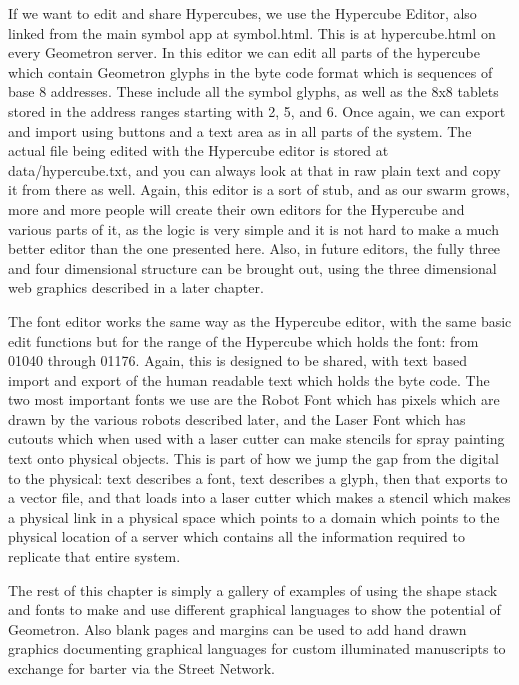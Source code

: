 If we want to edit and share Hypercubes, we use the Hypercube Editor, also linked from the main symbol app at symbol.html.  This is at hypercube.html on every Geometron server.  In this editor we can edit all parts of the hypercube which contain Geometron glyphs in the byte code format which is sequences of base 8 addresses.  These include all the symbol glyphs, as well as the 8x8 tablets stored in the address ranges starting with 2, 5, and 6.  Once again, we can export and import using buttons and a text area as in all parts of the system.  The actual file being edited with the Hypercube editor is stored at data/hypercube.txt, and you can always look at that in raw plain text and copy it from there as well.  Again, this editor is a sort of stub, and as our swarm grows, more and more people will create their own editors for the Hypercube and various parts of it, as the logic is very simple and it is not hard to make a much better editor than the one presented here. Also, in future editors, the fully three and four dimensional structure can be brought out, using the three dimensional web graphics described in a later chapter.  

The font editor works the same way as the Hypercube editor, with the same basic edit functions but for the range of the Hypercube which holds the font: from 01040 through 01176.  Again, this is designed to be shared, with text based import and export of the human readable text which holds the byte code. The two most important fonts we use are the Robot Font which has pixels which are drawn by the various robots described later, and the Laser Font which has cutouts which when used with a laser cutter can make stencils for spray painting text onto physical objects.  This is part of how we jump the gap from the digital to the physical: text describes a font, text describes a glyph, then that exports to a vector file, and that loads into a laser cutter which makes a stencil which makes a physical link in a physical space which points to a domain which points to the physical location of a server which contains all the information required to replicate that entire system.

The rest of this chapter is simply a gallery of examples of using the shape stack and fonts to make and use different graphical languages to show the potential of Geometron.  Also blank pages and margins can be used to add hand drawn graphics documenting graphical languages for custom illuminated manuscripts to exchange for barter via the Street Network.


